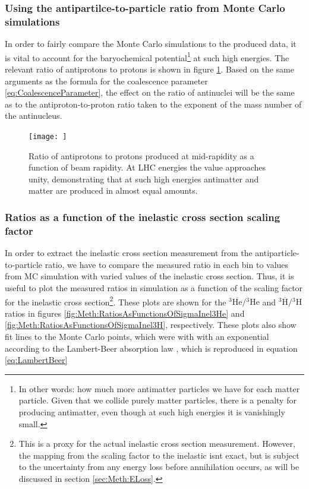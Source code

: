 \subsubsection{Using the antipartilce-to-particle ratio from Monte Carlo simulations}\label{sec:MCSim}
In order to fairly compare the Monte Carlo simulations to the produced data, it is vital to account for the baryochemical potential\footnote{In other words: how much more antimatter particles we have for each matter particle. Given that we collide purely matter particles, there is a penalty for producing antimatter, even though at such high energies it is vanishingly small.} at such high energies. The relevant ratio of antiprotons to protons is shown in figure \ref{fig:BaryochemicalPotential}. Based on the same arguments as the formula for the coalescence parameter \ref{eq:CoalescenceParameter}, the effect on the ratio of antinuclei will be the same as to the antiproton-to-proton ratio taken to the exponent of the mass number of the antinucleus. 

\begin{figure}
    \centering
    \texttt{[image: ]}
    \caption{Ratio of antiprotons to protons produced at mid-rapidity as a function of beam rapidity. At LHC energies the value approaches unity, demonstrating that at such high energies antimatter and matter are produced in almost equal amounts.}
    \label{fig:BaryochemicalPotential}
\end{figure}



\subsubsection{Ratios as a function of the inelastic cross section scaling factor}
In order to extract the inelastic cross section measurement from the antiparticle-to-particle ratio, we have to compare the measured ratio in each bin to values from MC simulation with varied values of the inelastic cross section. Thus, it is useful to plot the measured ratios in simulation as a function of the scaling factor for the inelastic cross section\footnote{This is a proxy for the actual inelastic cross section measurement. However, the mapping from the scaling factor to the inelastic isnt exact, but is subject to the uncertainty from any energy loss before annihilation occurs, as will be discussed in section \ref{sec:Meth:ELoss}.}. These plots are shown for the $^3\overline{\mathrm{He}}/{^3\mathrm{He}}$ and $^3\overline{\mathrm{H}}/{^3\mathrm{H}}$ ratios in figures \ref{fig:Meth:RatiosAsFunctionsOfSigmaInel3He} and \ref{fig:Meth:RatiosAsFunctionsOfSigmaInel3H}, respectively. These plots also show fit lines to the Monte Carlo points, which were with with an exponential according to the Lambert-Beer absorption law \cite{}, which is reproduced in equation \ref{eq:LambertBeer}

